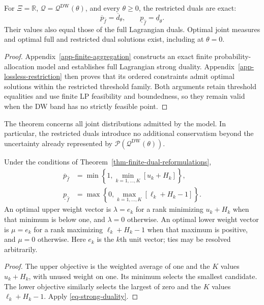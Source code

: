 \begin{theorem}
  \label{thm-finite-dual-reformulations}
  For $\Xi=\mathbb R$, $\mathscr Q=\mathscr Q^{\mathrm{DW}}(\theta)$, and every $\theta\ge0$, the restricted duals are exact:
  \begin{equation}
    \overline p_{\hat f}=\overline d_\theta,\qquad
    \underline p_{\hat f}=\underline d_\theta.
    \label{eq-strong-duality}
  \end{equation}
  Their values also equal those of the full Lagrangian duals. Optimal joint measures and optimal full and restricted dual solutions exist, including at $\theta=0$.
\end{theorem}
\begin{proof}
  Appendix~\ref{app-finite-aggregation} constructs an exact finite probability-allocation model and establishes full Lagrangian strong duality. Appendix~\ref{app-lossless-restriction} then proves that its ordered constraints admit optimal solutions within the restricted threshold family. Both arguments retain threshold equalities and use finite LP feasibility and boundedness, so they remain valid when the DW band has no strictly feasible point.
\end{proof}

The theorem concerns all joint distributions admitted by the model. In particular, the restricted duals introduce no additional conservatism beyond the uncertainty already represented by $\mathscr P\left(\mathscr Q^{\mathrm{DW}}(\theta)\right)$.

\begin{corollary}
  \label{thm-closed-form-bounds}
  Under the conditions of Theorem~\ref{thm-finite-dual-reformulations},
  \begin{align}
    \overline p_{\hat f}
    &=\min\left\{1,\min_{k=1,\ldots,K}\left[u_k+H_k\right]\right\},
    \label{eq-dw-closed-upper}\\
    \underline p_{\hat f}
    &=\max\left\{0,\max_{k=1,\ldots,K}\left[\ell_k+H_k-1\right]\right\}.
    \label{eq-dw-closed-lower}
  \end{align}
  An optimal upper weight vector is $\lambda=e_k$ for a rank minimizing $u_k+H_k$ when that minimum is below one, and $\lambda=0$ otherwise. An optimal lower weight vector is $\mu=e_k$ for a rank maximizing $\ell_k+H_k-1$ when that maximum is positive, and $\mu=0$ otherwise. Here $e_k$ is the $k$th unit vector; ties may be resolved arbitrarily.
\end{corollary}
\begin{proof}
  The upper objective is the weighted average of one and the $K$ values $u_k+H_k$, with unused weight on one. Its minimum selects the smallest candidate. The lower objective similarly selects the largest of zero and the $K$ values $\ell_k+H_k-1$. Apply \eqref{eq-strong-duality}.
\end{proof}

